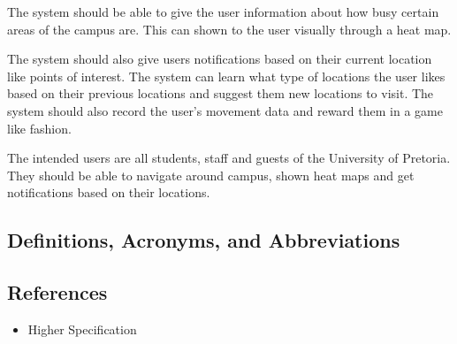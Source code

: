 \documentclass[11pt]{article}
\begin{document}
	The system should be able to give the user information about how busy certain areas of the campus are. This can shown to the user visually through a heat map.
	
	The system should also give users notifications based on their current location like points of interest. The system can learn what type of locations the user likes based on their previous locations and suggest them new locations to visit. The system should also record the user's movement data and reward them in a game like fashion. 
	
	    The intended users are all students, staff and guests of the University of Pretoria. They should be able to navigate around campus, shown heat maps and get notifications based on their locations.
	
	\subsection{Definitions, Acronyms, and Abbreviations}
	\begin{table}[]
		\centering
	\end{table}

	\subsection{References}
	\begin{itemize}
		\item Higher Specification
	\end{itemize}
\end{document}
